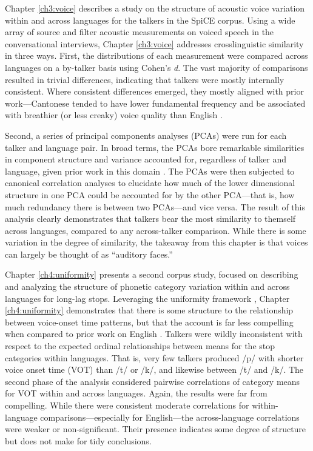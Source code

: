 Chapter \ref{ch3:voice} describes a study on the structure of acoustic voice variation within and across languages for the talkers in the SpiCE corpus. Using a wide array of source and filter acoustic measurements on voiced speech in the conversational interviews, Chapter \ref{ch3:voice} addresses crosslinguistic similarity in three ways. First, the distributions of each measurement were compared across languages on a by-talker basis using Cohen's \textit{d}. The vast majority of comparisons resulted in trivial differences, indicating that talkers were mostly internally consistent. Where consistent differences emerged, they mostly aligned with prior work---Cantonese tended to have lower fundamental frequency and be associated with breathier (or less creaky) voice quality than English \citep{ng_2012_ltas}. 

Second, a series of principal components analyses (PCAs) were run for each talker and language pair. In broad terms, the PCAs bore remarkable similarities in component structure and variance accounted for, regardless of talker and language, given prior work in this domain \citep{lee_2019_acoustic, lee_2019_spontaneous, lee_2020_language}. The PCAs were then subjected to canonical correlation analyses to elucidate how much of the lower dimensional structure in one PCA could be accounted for by the other PCA---that is, how much redundancy there is between two PCAs---and vice versa. The result of this analysis clearly demonstrates that talkers bear the most similarity to themself across languages, compared to any across-talker comparison. While there is some variation in the degree of similarity, the takeaway from this chapter is that voices can largely be thought of as ``auditory faces.''

Chapter \ref{ch4:uniformity} presents a second corpus study, focused on describing and analyzing the structure of phonetic category variation within and across languages for long-lag stops. Leveraging the uniformity framework \citep{chodroff_2017_structure}, Chapter \ref{ch4:uniformity} demonstrates that there is some structure to the relationship between voice-onset time patterns, but that the account is far less compelling when compared to prior work on English \citep{chodroff_2017_structure, chodroff_2019_l2}. Talkers were wildly inconsistent with respect to the expected ordinal relationships between means for the stop categories within languages. That is, very few talkers produced /p/ with shorter voice onset time (VOT) than /t/ or /k/, and likewise between /t/ and /k/. The second phase of the analysis considered pairwise correlations of category means for VOT within and across languages. Again, the results were far from compelling. While there were consistent moderate correlations for within-language comparisons---especially for English---the across-language correlations were weaker or non-significant. Their presence indicates some degree of structure but does not make for tidy conclusions. 

